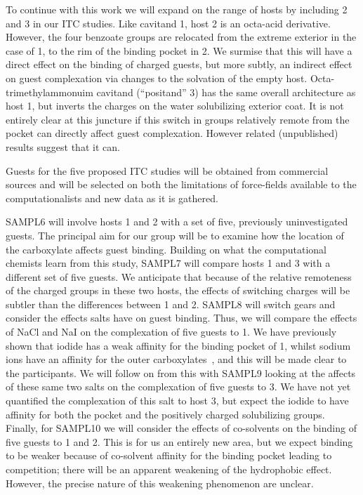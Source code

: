 \documentclass[11pt]{article}
\begin{document}
To continue with this work we will expand on the range of hosts by including 2 and 3 in our ITC studies.  Like cavitand 1, host 2 is an octa-acid derivative.  However, the four benzoate groups are relocated from the extreme exterior in the case of 1, to the rim of the binding pocket in 2.  We surmise that this will have a direct effect on the binding of charged guests, but more subtly, an indirect effect on guest complexation via changes to the solvation of the empty host.  Octa-trimethylammonuim cavitand (``positand'' 3) has the same overall architecture as host 1, but inverts the charges on the water solubilizing exterior coat.  It is not entirely clear at this juncture if this switch in groups relatively remote from the pocket can directly affect guest complexation.  However related (unpublished) results suggest that it can.

Guests for the five proposed ITC studies will be obtained from commercial sources and will be selected on both the limitations of force-fields available to the computationalists and new data as it is gathered.   

SAMPL6 will involve hosts 1 and 2 with a set of five, previously uninvestigated guests.  The principal aim for our group will be to examine how the location of the carboxylate affects guest binding.  Building on what the computational chemists learn from this study, SAMPL7 will compare hosts 1 and 3 with a different set of five guests.  We anticipate that because of the relative remoteness of the charged groups in these two hosts, the effects of switching charges will be subtler than the differences between 1 and 2.  SAMPL8 will switch gears and consider the effects salts have on guest binding.  Thus, we will compare the effects of NaCl and NaI on the complexation of five guests to 1.  We have previously shown that iodide has a weak affinity for the binding pocket of 1, whilst sodium ions have an affinity for the outer carboxylates~\cite{carnegie_anion_2014}, and this will be made clear to the participants.  We will follow on from this with SAMPL9 looking at the affects of these same two salts on the complexation of five guests to 3.  We have not yet quantified the complexation of this salt to host 3, but expect the iodide to have affinity for both the pocket and the positively charged solubilizing groups.  Finally, for SAMPL10 we will consider the effects of co-solvents on the binding of five guests to 1 and 2.  This is for us an entirely new area, but we expect binding to be weaker because of co-solvent affinity for the binding pocket leading to competition; there will be an apparent weakening of the hydrophobic effect.  However, the precise nature of this weakening phenomenon are unclear.
\end{document}
